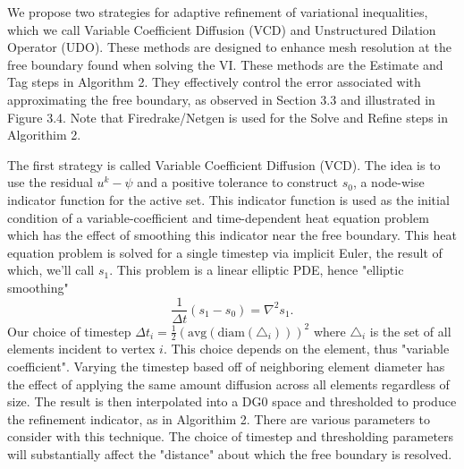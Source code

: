 \documentclass[]{interact}
\theoremstyle{plain}%
\theoremstyle{definition}
\theoremstyle{remark}
\begin{document}
We propose two strategies for adaptive refinement of variational inequalities, which we call Variable Coefficient Diffusion (VCD) and Unstructured Dilation Operator (UDO). These methods are designed to enhance mesh resolution at the free boundary found when solving the VI. These methods are the Estimate and Tag steps in Algorithm 2. They effectively control the error associated with approximating the free boundary, as observed in Section 3.3 and illustrated in Figure 3.4. Note that Firedrake/Netgen is used for the Solve and Refine steps in Algorithim 2.

The first strategy is called Variable Coefficient Diffusion (VCD). The idea is to use the residual $u^k - \psi$ and a positive tolerance to construct $s_0$, a node-wise indicator function for the active set. This indicator function is used as the initial condition of a variable-coefficient and time-dependent heat equation problem which has the effect of smoothing this indicator near the free boundary. This heat equation problem is solved for a single timestep via implicit Euler, the result of which, we'll call $s_1$. This problem is a linear elliptic PDE, hence "elliptic smoothing"
\begin{equation}
  \frac{1}{\Delta t}(s_1 - s_0) = \nabla^2 s_1.
\end{equation}
Our choice of timestep $\Delta t_i = \frac{1}{2}(\text{avg}(\text{diam}(\triangle_i)))^2$ where $\triangle_i$ is the set of all elements incident to vertex $i$. This choice depends on the element, thus "variable coefficient". Varying the timestep based off of neighboring element diameter has the effect of applying the same amount diffusion across all elements regardless of size. The result is then interpolated into a DG0 space and thresholded to produce the refinement indicator, as in Algorithim 2. There are various parameters to consider with this technique. The choice of timestep and thresholding parameters will substantially affect the "distance" about which the free boundary is resolved. 
\end{document}
